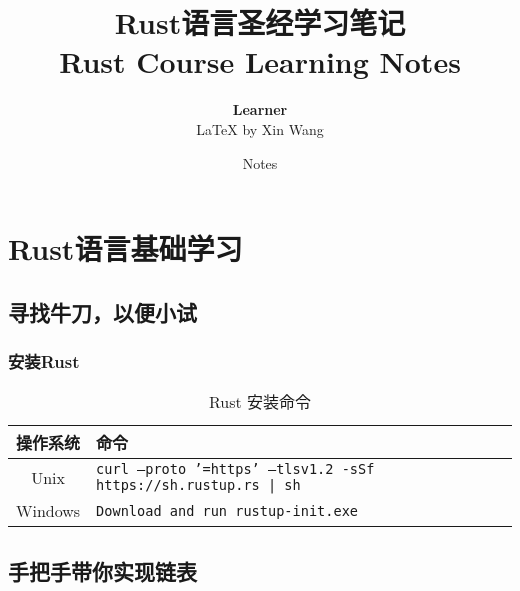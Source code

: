 \documentclass[oneside]{book}
\def\notetitle{Rust语言圣经学习笔记\\Rust Course Learning Notes}
\def\noteauthor{
    \textbf{Learner}\\
    {\LaTeX} by Xin Wang\\
}
\def\notedate{Notes}
\begin{document}
\title{
    \textbf{
        \LARGE{\notetitle} \vspace*{10\baselineskip}
    }
}
\author{\noteauthor}
\date{\notedate}

\maketitle
\newpage

\tableofcontents  %
\listoffigures    %
\listoftables     %
\newpage


\part{\textbf{Rust}语言基础学习}

\chapter{寻找牛刀，以便小试}

\section{安装\textbf{Rust}}{
\begin{table}[h]
\centering
\begin{tabular}{|c|l|}
\hline
操作系统 & 命令 \\
\hline
Unix & \texttt{curl --proto '=https' --tlsv1.2 -sSf https://sh.rustup.rs | sh} \\
\hline
Windows & \texttt{Download and run rustup-init.exe} \\
\hline
\end{tabular}
\caption{Rust 安装命令}
\end{table}
}

\chapter{手把手带你实现链表}
\end{document}
